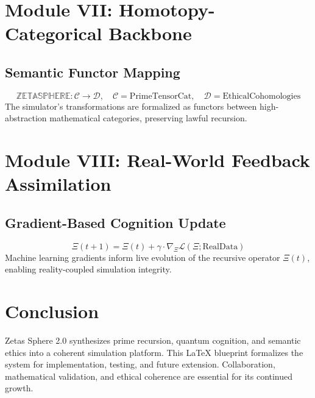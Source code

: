 \documentclass[12pt]{article}
\begin{document}
\section{Module VII: Homotopy-Categorical Backbone}
\subsection*{Semantic Functor Mapping}
\begin{equation}
\mathbb{ZETASPHERE} : \mathcal{C} \to \mathcal{D}, \quad \mathcal{C} = \text{PrimeTensorCat}, \quad \mathcal{D} = \text{EthicalCohomologies}
\end{equation}
The simulator's transformations are formalized as functors between high-abstraction mathematical categories, preserving lawful recursion.

\section{Module VIII: Real-World Feedback Assimilation}
\subsection*{Gradient-Based Cognition Update}
\begin{equation}
\Xi(t+1) = \Xi(t) + \gamma \cdot \nabla_{\Xi} \mathcal{L}(\Xi; \text{RealData})
\end{equation}
Machine learning gradients inform live evolution of the recursive operator \(\Xi(t)\), enabling reality-coupled simulation integrity.

\section{Conclusion}
Zetas Sphere 2.0 synthesizes prime recursion, quantum cognition, and semantic ethics into a coherent simulation platform. This LaTeX blueprint formalizes the system for implementation, testing, and future extension. Collaboration, mathematical validation, and ethical coherence are essential for its continued growth.
\end{document}
